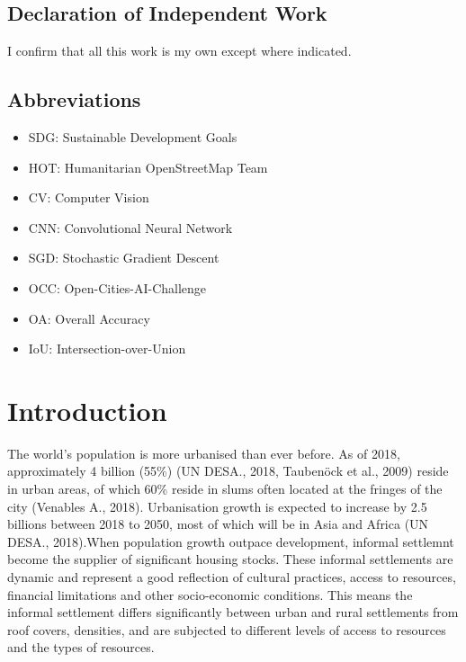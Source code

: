 \documentclass[11pt, a4paper, twoside]{report}
\begin{document}
\newpage
\section{Declaration of Independent Work}

I confirm that all this work is my own except where indicated.

\newpage

\listoffigures

\newpage

\listoftables
\clearpage

\newpage

\section{Abbreviations}

\begin{itemize}
  \item SDG: Sustainable Development Goals
  \item HOT: Humanitarian OpenStreetMap Team
  \item CV: Computer Vision
  \item CNN: Convolutional Neural Network
  \item SGD: Stochastic Gradient Descent
  \item OCC: Open-Cities-AI-Challenge
  \item OA: Overall Accuracy
  \item IoU: Intersection-over-Union
\end{itemize}

\newpage


\tableofcontents

\newpage

\chapter{Introduction}\label{Intro}

The world’s population is more urbanised than ever before. As of 2018, approximately 4 billion (55\%) (UN DESA., 2018, Taubenöck et al., 2009) reside in urban areas, of which 60\% reside in slums often located at the fringes of the city (Venables A., 2018). Urbanisation growth is expected to increase by 2.5 billions between 2018 to 2050, most of which will be in Asia and Africa (UN DESA., 2018).When population growth outpace development, informal settlemnt become the supplier of significant housing stocks. These informal settlements are dynamic and represent a good reflection of cultural practices, access to resources, financial limitations and other socio-economic conditions. This means the informal settlement differs significantly between urban and rural settlements from roof covers, densities, and are subjected to different levels of access to resources and the types of resources.\\\par
\end{document}
